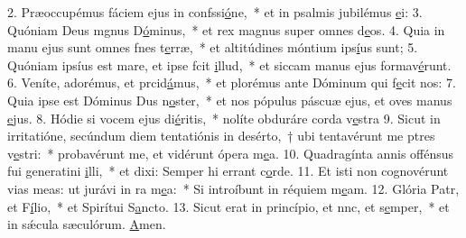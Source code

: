2. Præoccupémus fáciem ejus in confssi\uline{ó}ne,~* et in psalmis jubilémus \uline{e}i:
3. Quóniam Deus mgnus D\uline{ó}minus,~* et rex magnus super omnes d\uline{e}os.
4. Quia in manu ejus sunt omnes fnes t\uline{e}rræ,~* et altitúdines móntium ips\uline{í}us sunt;
5. Quóniam ipsíus est mare, et ipse fcit \uline{i}llud,~* et siccam manus ejus formav\uline{é}runt.
6. Veníte, adorémus, et prcid\uline{á}mus,~* et plorémus ante Dóminum qui f\uline{e}cit nos:
7. Quia ipse est Dóminus Dus n\uline{o}ster,~* et nos pópulus páscuæ ejus, et oves manus \uline{e}jus.
8. Hódie si vocem ejus di\uline{é}ritis,~* nolíte obduráre corda v\uline{e}stra
9. Sicut in irritatióne, secúndum diem tentatiónis in desérto,~† ubi tentavérunt me ptres v\uline{e}stri:~* probavérunt me, et vidérunt ópera m\uline{e}a.
10. Quadragínta annis offénsus fui generatini \uline{i}lli,~* et dixi: Semper hi errant c\uline{o}rde.
11. Et isti non cognovérunt vias meas: ut jurávi in ra m\uline{e}a:~* Si introíbunt in réquiem m\uline{e}am.
12. Glória Patr, et F\uline{í}lio,~* et Spirítui S\uline{a}ncto.
13. Sicut erat in princípio, et nnc, et s\uline{e}mper,~* et in sǽcula sæculórum. \uline{A}men.
